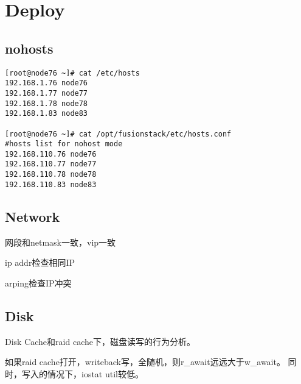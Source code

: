 \chapter{Deploy}

\section{nohosts}

\begin{lstlisting}[frame=single]
[root@node76 ~]# cat /etc/hosts
192.168.1.76 node76
192.168.1.77 node77
192.168.1.78 node78
192.168.1.83 node83

[root@node76 ~]# cat /opt/fusionstack/etc/hosts.conf 
#hosts list for nohost mode
192.168.110.76 node76
192.168.110.77 node77
192.168.110.78 node78
192.168.110.83 node83
\end{lstlisting}

\section{Network}

网段和netmask一致，vip一致

ip addr检查相同IP

arping检查IP冲突 

\section{Disk}

Disk Cache和raid cache下，磁盘读写的行为分析。

如果raid cache打开，writeback写，全随机，则r_await远远大于w_await。
同时，写入的情况下，iostat util较低。


